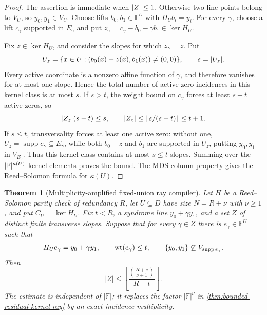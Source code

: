 \documentclass[11pt,a4paper]{amsart}
\numberwithin{equation}{section}
\newtheorem{theorem}{Theorem}[section]
\theoremstyle{remark}
\DeclareMathOperator{\supp}{supp}\DeclareMathOperator{\Fib}{Fib}\DeclareMathOperator{\Sym}{Sym}
\newcommand{\F}{\mathbb F}\newcommand{\B}{\mathbb B}\newcommand{\K}{\mathbb K}\newcommand{\Z}{\mathbb Z}
\begin{document}
\begin{proof}
The assertion is immediate when \(\lvert Z\rvert\le1\).  Otherwise two line
points belong to \(V_U\), so \(y_0,y_1\in V_U\).  Choose lifts
\(b_0,b_1\in\F^U\) with \(H_Ub_i=y_i\).  For every \(\gamma\), choose a
lift \(c_\gamma\) supported in \(E_\gamma\) and put
\(z_\gamma=c_\gamma-b_0-\gamma b_1\in\ker H_U\).

Fix \(z\in\ker H_U\), and consider the slopes for which
\(z_\gamma=z\).  Put
\[
 U_z=\{x\in U:(b_0(x)+z(x),b_1(x))\ne(0,0)\},
 \qquad s=\lvert U_z\rvert.
\]
Every active coordinate is a nonzero affine function of \(\gamma\), and
therefore vanishes for at most one slope.  Hence the total number of active
zero incidences in this kernel class is at most \(s\).  If \(s>t\), the
weight bound on \(c_\gamma\) forces at least \(s-t\) active zeros, so
\[
 \lvert Z_z\rvert(s-t)\le s,\qquad
 \lvert Z_z\rvert\le\left\lfloor s/(s-t)\right\rfloor\le t+1.
\]
If \(s\le t\), transversality forces
at least one active zero: without one,
\(U_z=\supp c_\gamma\subseteq E_\gamma\), while both \(b_0+z\) and
\(b_1\) are supported in \(U_z\), putting \(y_0,y_1\) in
\(V_{E_\gamma}\).  Thus this kernel class contains at most \(s\le t\)
slopes.  Summing over the \(\abs{\F}^{\kappa(U)}\) kernel elements proves
the bound.  The MDS column property gives the Reed--Solomon formula for
\(\kappa(U)\).
\end{proof}


\begin{theorem}[Multiplicity-amplified fixed-union ray compiler]
\label{thm:fixed-union-ray}
Let \(H\) be a Reed--Solomon parity check of redundancy \(R\), let
\(U\subseteq D\) have size \(N=R+\nu\) with \(\nu\ge1\), and put
\(C_U=\ker H_U\).  Fix \(t<R\), a syndrome line
\(y_0+\gamma y_1\), and a set \(Z\) of distinct finite transverse slopes.
Suppose that for every \(\gamma\in Z\) there is
\(e_\gamma\in\F^U\) such that
\[
 H_Ue_\gamma=y_0+\gamma y_1,
 \qquad \wt(e_\gamma)\le t,
 \qquad
 \{y_0,y_1\}\not\subseteq V_{\supp e_\gamma}.
\]
Then
\begin{equation}
 |Z|\le
 \left\lfloor
 \frac{\binom{R+\nu}{\nu+1}}{R-t}
 \right\rfloor .
 \label{eq:fixed-union-ray}
\end{equation}
The estimate is independent of \(|\F|\); it replaces the factor
\(|\F|^\nu\) in \cref{thm:bounded-residual-kernel-ray} by an exact
incidence multiplicity.
\end{theorem}
\end{document}
